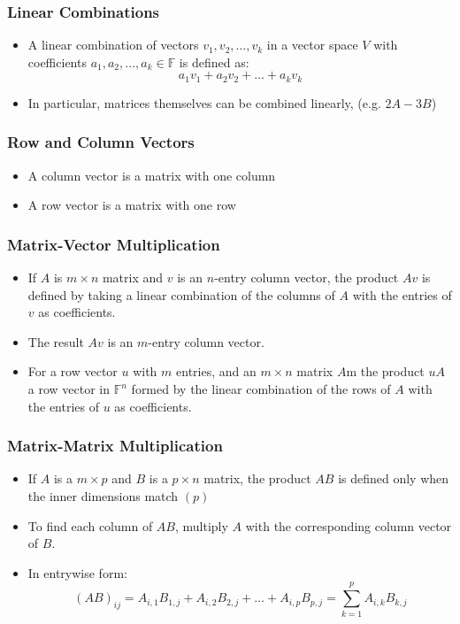 \documentclass[a4paper, 9pt]{extarticle}
\begin{document}
\subsubsection*{Linear Combinations}
\begin{itemize}
  \item A linear combination of vectors $v_1, v_2, \ldots, v_k$ in a vector space $V$ with coefficients $a_1, a_2, \ldots, a_k \in \mathbb{F}$ is defined as:
        $$ a_1v_1 + a_2v_2 + \ldots + a_kv_k$$
  \item In particular, matrices themselves can be combined linearly, (e.g. $2A - 3B$)
\end{itemize}
\subsubsection*{Row and Column Vectors}
\begin{itemize}
  \item A column vector is a matrix with one column
  \item A row vector is a matrix with one row
\end{itemize}
\subsubsection*{Matrix-Vector Multiplication}
\begin{itemize}
  \item If $A$ is $m \times n$ matrix and $v$ is an $n$-entry column vector, the product $Av$ is defined by taking a linear combination of the columns of $A$ with the entries of $v$ as coefficients.
  \item The result $Av$ is an $m$-entry column vector.
  \item For a row vector $u$ with $m$ entries, and an $m \times n$ matrix $A$m the product $uA$ a row vector in $\mathbb{F}^n$ formed by the linear combination of the rows of $A$ with the entries of $u$ as coefficients.
\end{itemize}
\subsubsection*{Matrix-Matrix Multiplication}
\begin{itemize}
  \item If $A$ is a $m \times p$ and $B$ is a $p \times n$ matrix, the product $AB$ is defined only when the inner dimensions match $(p)$
  \item To find each column of $AB$, multiply $A$ with the corresponding column vector of $B$.
  \item In entrywise form:
        $$
          (AB)_{ij} = A_{i,1}B_{1,j} + A_{i,2}B_{2,j} + \ldots + A_{i,p}B_{p,j} = \sum_{k=1}^p A_{i,k}B_{k,j}
        $$
\end{itemize}
\end{document}
